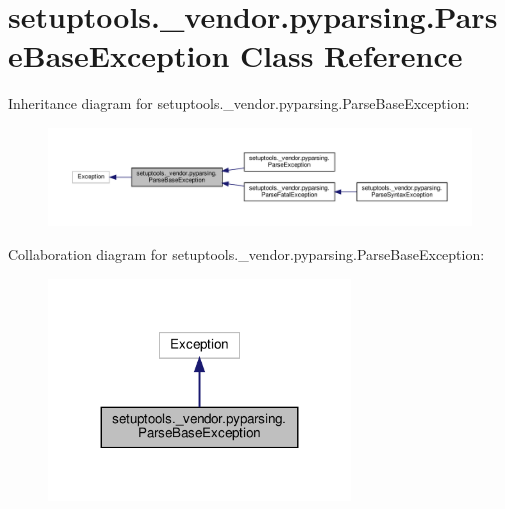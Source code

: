 \hypertarget{classsetuptools_1_1__vendor_1_1pyparsing_1_1ParseBaseException}{}\section{setuptools.\+\_\+vendor.\+pyparsing.\+Parse\+Base\+Exception Class Reference}
\label{classsetuptools_1_1__vendor_1_1pyparsing_1_1ParseBaseException}


Inheritance diagram for setuptools.\+\_\+vendor.\+pyparsing.\+Parse\+Base\+Exception\+:
\nopagebreak
\begin{figure}[H]
\begin{center}
\leavevmode
\includegraphics[width=350pt]{classsetuptools_1_1__vendor_1_1pyparsing_1_1ParseBaseException__inherit__graph}
\end{center}
\end{figure}


Collaboration diagram for setuptools.\+\_\+vendor.\+pyparsing.\+Parse\+Base\+Exception\+:
\nopagebreak
\begin{figure}[H]
\begin{center}
\leavevmode
\includegraphics[width=227pt]{classsetuptools_1_1__vendor_1_1pyparsing_1_1ParseBaseException__coll__graph}
\end{center}
\end{figure}
